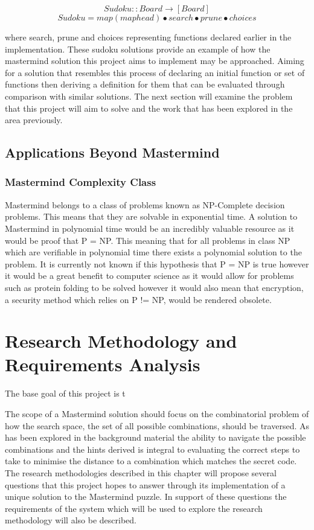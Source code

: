 \documentclass[11pt]{article}  %
\theoremstyle{definition}
\theoremstyle{remark}
\begin{document}
\[ Sudoku :: Board \rightarrow [Board]\]
\[ Sudoku = map (map head) \bullet search \bullet prune \bullet choices\]

where search, prune and choices representing functions declared earlier in the implementation. These sudoku solutions provide an example of how the mastermind solution this project aims to implement may be approached. Aiming for a solution that resembles this process of declaring an initial function or set of functions then deriving a definition for them that can be evaluated through comparison with similar solutions. The next section will examine the problem that this project will aim to solve and the work that has been explored in the area previously.

\subsection {Applications Beyond Mastermind}

\subsubsection {Mastermind Complexity Class}
Mastermind belongs to a class of problems known as NP-Complete decision problems. This means that they are solvable in exponential time. A solution to Mastermind in polynomial time
would be an incredibly valuable resource as it would be proof that P = NP. This meaning that for all problems in class NP which are verifiable in polynomial time there exists a polynomial
solution to the problem. It is currently not known if this hypothesis that P = NP is true however it would be a great benefit to computer science as it would allow for problems such as
protein folding to be solved however it would also mean that encryption, a security method which relies on P != NP, would be rendered obsolete.

\newpage                     %
\section{Research Methodology and Requirements Analysis}\label{ss:back}

The base goal of this project is t

The scope of a Mastermind solution should focus on the combinatorial problem of how the search space, the set of all possible combinations, should be traversed. As has been explored in the background material the ability to navigate the possible combinations and the hints derived is integral to evaluating the correct steps to take to minimise the distance to a combination which matches the secret code. The research methodologies described in this chapter will propose several questions that this project hopes to answer through its implementation of a unique solution to the Mastermind puzzle. In support of these questions the requirements of the system which will be used to explore the research methodology will also be described.
\end{document}
